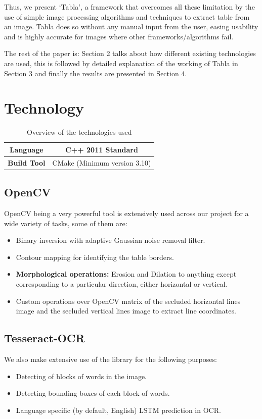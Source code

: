 \documentclass[10pt,journal,compsoc]{IEEEtran}
\begin{document}
Thus, we present `Tabla', a framework that overcomes all these limitation by the use of simple image processing algorithms and techniques to extract table from an image. Tabla does so without any manual input from the user, easing usability and is highly accurate for images where other frameworks/algorithms fail.

The rest of the paper is: Section 2 talks about how different existing technologies are used, this is followed by detailed explanation of the working of Tabla in Section 3 and finally the results are presented in Section 4.

    
\section{Technology}

\begin{table}[!h]
\renewcommand{\arraystretch}{1.3}
\caption{Overview of the technologies used}
\label{table_example}
\centering
\begin{tabular}{|c||c|}
\hline
\textbf{Language} & C++ 2011 Standard\\
\hline
\textbf{Build Tool} & CMake (Minimum version 3.10)\\
\hline
\end{tabular}
\end{table}

\subsection{OpenCV\cite{opencv_library}}
OpenCV being a very powerful tool is extensively used across our project for a wide variety of tasks, some of them are:
\begin{itemize}
    \item Binary inversion with adaptive Gaussian noise removal filter.
    \item Contour mapping for identifying the table borders.
    \item \textbf{Morphological operations:} Erosion and Dilation \cite{gonzalez2002richard} to anything except corresponding to a particular direction, either horizontal or vertical.
    \item Custom operations over OpenCV matrix of the secluded horizontal lines image and the secluded vertical lines image to extract line coordinates.
\end{itemize}
\subsection{Tesseract-OCR\cite{googleTesseract}}
We also make extensive use of the  library for the following purposes:
\begin{itemize}
    \item Detecting of blocks of words in the image.
    \item Detecting bounding boxes of each block of words.
    \item Language specific (by default, English) LSTM prediction in OCR.
\end{itemize}
\end{document}

